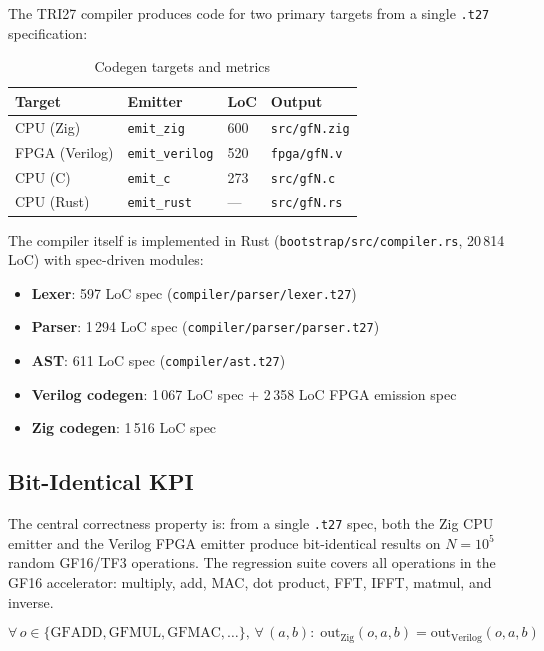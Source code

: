 The TRI27 compiler produces code for two primary targets from a single \texttt{.t27} specification:

\begin{table}[h]
\centering
\caption{Codegen targets and metrics}
\label{tab:codegen-targets}
\begin{tabular}{llll}
\toprule
\textbf{Target} & \textbf{Emitter} & \textbf{LoC} & \textbf{Output} \\
\midrule
CPU (Zig)   & \texttt{emit\_zig}    & 600 & \texttt{src/gfN.zig} \\
FPGA (Verilog) & \texttt{emit\_verilog} & 520 & \texttt{fpga/gfN.v} \\
CPU (C)     & \texttt{emit\_c}       & 273 & \texttt{src/gfN.c} \\
CPU (Rust)  & \texttt{emit\_rust}    & --- & \texttt{src/gfN.rs} \\
\bottomrule
\end{tabular}
\end{table}

The compiler itself is implemented in Rust (\texttt{bootstrap/src/compiler.rs}, 20\,814 LoC) with spec-driven modules:
\begin{itemize}
\item \textbf{Lexer}: 597 LoC spec (\texttt{compiler/parser/lexer.t27})
\item \textbf{Parser}: 1\,294 LoC spec (\texttt{compiler/parser/parser.t27})
\item \textbf{AST}: 611 LoC spec (\texttt{compiler/ast.t27})
\item \textbf{Verilog codegen}: 1\,067 LoC spec + 2\,358 LoC FPGA emission spec
\item \textbf{Zig codegen}: 1\,516 LoC spec
\end{itemize}

\subsection{Bit-Identical KPI}

The central correctness property is: from a single \texttt{.t27} spec, both the Zig CPU emitter and the Verilog FPGA emitter produce bit-identical results on $N = 10^5$ random GF16/TF3 operations. The regression suite covers all operations in the GF16 accelerator: multiply, add, MAC, dot product, FFT, IFFT, matmul, and inverse.

\begin{equation}
\forall\, o \in \{\text{GFADD}, \text{GFMUL}, \text{GFMAC}, \ldots\},\, \forall\, (a, b):\; \mathrm{out}_{\mathrm{Zig}}(o, a, b) = \mathrm{out}_{\mathrm{Verilog}}(o, a, b)
\end{equation}

